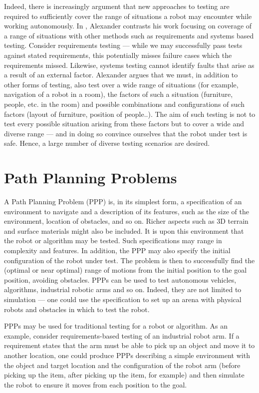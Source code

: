 \documentclass[authoryearcitations]{UoYCSproject}
\begin{document}
Indeed, there is increasingly argument that new approaches to testing are required to sufficiently cover the range of situations a robot may encounter while working autonomously.
In  \cite{rob}, Alexander contrasts his work focusing on coverage of a range of situations with other methods such as requirements and systems based testing. Consider requirements testing --- while we may successfully pass tests against stated requirements, this potentially misses failure cases which the requirements missed. Likewise, systems testing cannot identify faults that arise as a result of an external factor. Alexander argues that we must, in addition to other forms of testing, also test over a wide range of situations (for example, navigation of a robot in a room), the factors of such a situation (furniture, people, etc. in the room) and possible combinations and configurations of such factors (layout of furniture, position of people..). The aim of such testing is not to test every possible situation arising from these factors but to cover a wide and diverse range --- and in doing so convince ourselves that the robot under test is safe. Hence, a large number of diverse testing scenarios are desired.


\section{Path Planning Problems}
\label{sec:lit2}
A Path Planning Problem (PPP) is, in its simplest form, a specification of an environment to navigate and a description of its features, such as the size of the environment, location of obstacles, and so on. Richer aspects such as 3D terrain and surface materials might also be included. It is upon this environment that the robot or algorithm may be tested. Such specifications may range in complexity and features. In addition, the PPP may also specify the initial configuration of the robot under test. The problem is then to successfully find the (optimal or near optimal) range of motions from the initial position to the goal position, avoiding obstacles. PPPs can be used to test autonomous vehicles, algorithms, industrial robotic arms and so on. Indeed, they are not limited to simulation --- one could use the specification to set up an arena with physical robots and obstacles in which to test the robot.

PPPs may be used for traditional testing for a robot or algorithm. As an example, consider requirements-based testing of an industrial robot arm. If a requirement states that the arm must be able to pick up an object and move it to another location, one could produce PPPs describing a simple environment with the object and target location and the configuration of the robot arm (before picking up the item, after picking up the item, for example) and then simulate the robot to ensure it moves from each position to the goal.
\end{document}
